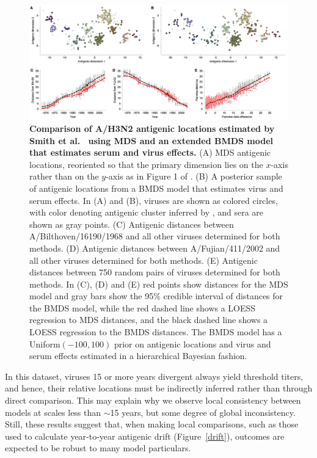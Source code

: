 \documentclass[11pt,oneside,letterpaper]{article}
\begin{document}
\begin{figure}[h]
	\centering		
	\includegraphics[width=1.0\textwidth]{figures/smith_comparison_effects}
	\caption{\textbf{Comparison of A/H3N2 antigenic locations estimated by Smith et al.\ \cite{Smith04} using MDS and an extended BMDS model that estimates serum and virus effects.} 
	(A) MDS antigenic locations, reoriented so that the primary dimension lies on the $x$-axis rather than on the $y$-axis as in Figure 1 of \cite{Smith04}.
	(B) A posterior sample of antigenic locations from a BMDS model that estimates virus and serum effects.
	In (A) and (B), viruses are shown as colored circles, with color denoting antigenic cluster inferred by \cite{Smith04}, and sera are shown as gray points.
	(C) Antigenic distances between A/Bilthoven/16190/1968 and all other viruses determined for both methods.
	(D) Antigenic distances between A/Fujian/411/2002 and all other viruses determined for both methods.
	(E) Antigenic distances between 750 random pairs of viruses determined for both methods.	
	In (C), (D) and (E) red points show distances for the MDS model and gray bars show the 95\% credible interval of distances for the BMDS model, while the red dashed line shows a LOESS regression to MDS distances, and the black dashed line shows a LOESS regression to the BMDS distances.
	The BMDS model has a Uniform$(-100,100)$ prior on antigenic locations and virus and serum effects estimated in a hierarchical Bayesian fashion. 	
	} 
	\label{smith_comparison_effects} 
\end{figure}

In this dataset, viruses 15 or more years divergent always yield threshold titers, and hence, their relative locations must be indirectly inferred rather than through direct comparison.
This may explain why we observe local consistency between models at scales less than $\sim$15 years, but some degree of global inconsistency.
Still, these results suggest that, when making local comparisons, such as those used to calculate year-to-year antigenic drift (Figure~\ref{drift}), outcomes are expected to be robust to  many model particulars.
\end{document}
